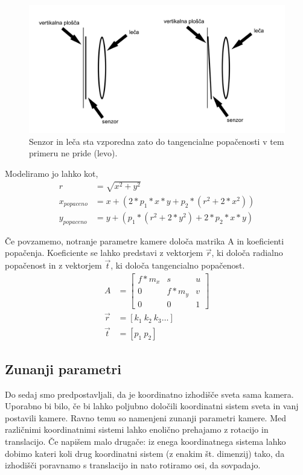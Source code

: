 \documentclass[a4paper, 12pt]{book}
\begin{document}
\begin{figure}[H]
\centering
\includegraphics[width=\textwidth,height=\textheight,keepaspectratio]{tangential.png}
\caption{Senzor in leča sta vzporedna zato do tangencialne popačenosti v tem primeru ne pride (levo).}
\end{figure}

Modeliramo jo lahko kot,
\begin{align}
\label{tangentialdisteq}
r &= \sqrt{x^2 + y^2} \\ 
x_{popaceno} &= x + (2 * p_1 * x * y + p_2 * (r^2 + 2 * x^2)) \\
y_{popaceno} &= y + (p_1 * (r^2 + 2*y^2) + 2 * p_2 * x * y)
\end{align}

Če povzamemo, notranje parametre kamere določa matrika A in koeficienti popačenja. Koeficiente se lahko predstavi z vektorjem $\vec{r}$, ki določa radialno popačenost in z vektorjem $\vec{t}$, ki določa tangencialno popačenost.
\begin{align*}
A &= 
\begin{bmatrix}
f*m_x & s & u \\
0 & f*m_y & v \\
0 & 0 & 1
\end{bmatrix} \\
\vec{r} &= [k_1 \ k_2 \ k_3 \dots] \\
\vec{t} &= [p_1 \ p_2]
\end{align*}

\subsection{Zunanji parametri}
Do sedaj smo predpostavljali, da je koordinatno izhodišče sveta sama kamera. Uporabno bi bilo, če bi lahko poljubno določili koordinatni sistem sveta in vanj postavili kamere. Ravno temu so namenjeni zunanji parametri kamere. Med različnimi koordinatnimi sistemi lahko enolično prehajamo z rotacijo in translacijo. Če napišem malo drugače: iz enega koordinatnega sistema lahko dobimo kateri koli drug koordinatni sistem (z enakim št. dimenzij) tako, da izhodišči poravnamo s translacijo in nato rotiramo osi, da sovpadajo. 
\end{document}
